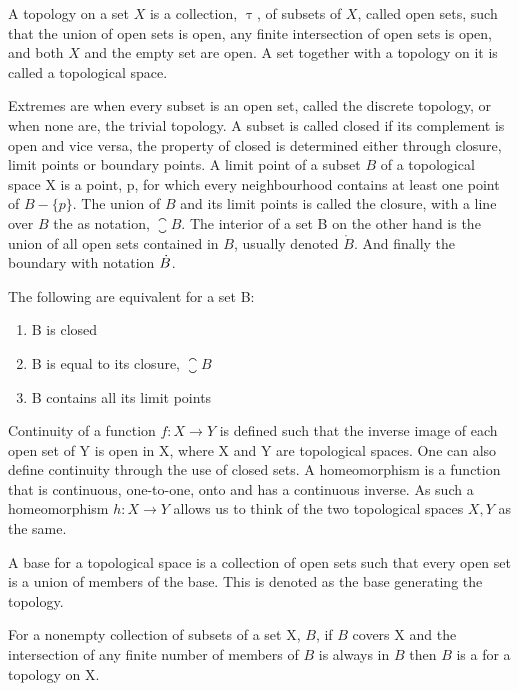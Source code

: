 \documentclass[../../main.tex]{subfiles}
\begin{document}
    A topology on a set $X$ is a collection, $\uptau$, of subsets of $X$, called open sets, such that the union of open sets is open, any finite intersection of open sets is open, and both $X$ and the empty set are open. A set together with a topology on it is called a topological space. 
            
    Extremes are when every subset is an open set, called the discrete topology, or when none are, the trivial topology. A subset is called closed if its complement is open and vice versa, the property of closed is determined either through closure, limit points or boundary points. A limit point of a subset $B$ of a topological space X is a point, p, for which every neighbourhood contains at least one point of $B - \{p\}$. The union of $B$ and its limit points is called the closure, with a line over $B$ the as notation, $\closure{B}$. The interior of a set B on the other hand is the union of all open sets contained in $B$, usually denoted $\mathring{B}$. And finally the boundary with notation $\dot{B}$.
    
    \begin{proposition}
        The following are equivalent for a set B:
        \begin{enumerate}
            \item B is closed
            \item B is equal to its closure, $\closure{B}$
            \item B contains all its limit points
        \end{enumerate}
    \end{proposition}
    
    Continuity of a function $f:X\to Y$ is defined such that the inverse image of each open set of Y is open in X, where X and Y are topological spaces. One can also define continuity through the use of closed sets. A homeomorphism is a function that is continuous, one-to-one, onto and has a continuous inverse. As such a homeomorphism $h:X\to Y$ allows us to think of the two topological spaces $X, Y$ as the same. 
    
    A base for a topological space is a collection of open sets such that every open set is a union of members of the base. This is denoted as the base generating the topology.
    
    \begin{definition}
        For a nonempty collection of subsets of a set X, $B$, if $B$ covers X and the intersection of any finite number of members of $B$ is always in $B$ then $B$ is a  for a topology on X.
    \end{definition}
    
\end{document}
